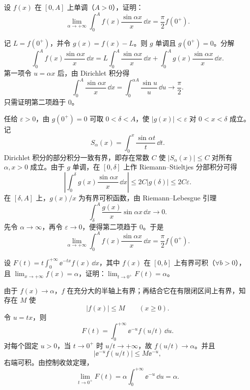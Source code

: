 \begin{xreferenceproblem}[4]
设 $f(x)$ 在 $[0,A]$ 上单调（$A>0$），证明：
  \[
    \lim_{\alpha\to+\infty}\int_0^A f(x)\frac{\sin\alpha x}{x}\,\dd x=\frac\pi2f(0^+).
  \]
\end{xreferenceproblem}
\begin{xsolution}
记 $L=f(0^+)$，并令 $g(x)=f(x)-L$。则 $g$ 单调且 $g(0^+)=0$。分解
\[
\int_0^A f(x)\frac{\sin\alpha x}{x}\,\dd x
=L\int_0^A\frac{\sin\alpha x}{x}\,\dd x
+\int_0^A g(x)\frac{\sin\alpha x}{x}\,\dd x.
\]
第一项令 $u=\alpha x$ 后，由 Dirichlet 积分得
\[
\int_0^A\frac{\sin\alpha x}{x}\,\dd x
=\int_0^{\alpha A}\frac{\sin u}{u}\,\dd u\to\frac\pi2.
\]
只需证明第二项趋于 $0$。

任给 $\varepsilon>0$，由 $g(0^+)=0$ 可取 $0<\delta<A$，使
$|g(x)|<\varepsilon$ 对 $0<x<\delta$ 成立。记
\[
S_\alpha(x)=\int_0^x\frac{\sin\alpha t}{t}\,\dd t.
\]
Dirichlet 积分的部分积分一致有界，即存在常数 $C$ 使
$|S_\alpha(x)|\leqslant C$ 对所有 $\alpha,x>0$ 成立。由于 $g$ 单调，在 $[0,\delta]$ 上作 Riemann--Stieltjes 分部积分可得
\[
\left|\int_0^\delta g(x)\frac{\sin\alpha x}{x}\,\dd x\right|
\leqslant2C|g(\delta)|\leqslant2C\varepsilon.
\]
在 $[\delta,A]$ 上，$g(x)/x$ 为有界可积函数，由 Riemann--Lebesgue 引理
\[
\int_\delta^A\frac{g(x)}x\sin\alpha x\,\dd x\to0.
\]
先令 $\alpha\to\infty$，再令 $\varepsilon\to0$，便得第二项趋于 $0$。于是
\[
\boxed{
\lim_{\alpha\to+\infty}
\int_0^A f(x)\frac{\sin\alpha x}{x}\,\dd x
=\frac\pi2f(0^+).}
\]
\end{xsolution}


\begin{xreferenceproblem}[5]
设 $F(t)=t\displaystyle\int_0^{+\infty}\ee^{-tx}f(x)\,\dd x$，其中 $f(x)$ 在 $[0,b]$ 上有界可积（$\forall b>0$），且 $\displaystyle\lim_{x\to+\infty}f(x)=\alpha$，证明：$\displaystyle\lim_{t\to0^+}F(t)=\alpha$。
\end{xreferenceproblem}
\begin{xsolution}
由于 $f(x)\to\alpha$，$f$ 在充分大的半轴上有界；再结合它在有限闭区间上有界，知存在 $M$ 使
\[
|f(x)|\leqslant M\qquad(x\geqslant0).
\]
令 $u=tx$，则
\[
F(t)=\int_0^{+\infty}\ee^{-u}f(u/t)\,\dd u.
\]
对每个固定 $u>0$，当 $t\to0^+$ 时 $u/t\to+\infty$，故
$f(u/t)\to\alpha$。并且
\[
|\ee^{-u}f(u/t)|\leqslant M\ee^{-u},
\]
右端可积。由控制收敛定理，
\[
\boxed{
\lim_{t\to0^+}F(t)
=\alpha\int_0^{+\infty}\ee^{-u}\,\dd u=\alpha.}
\]
\end{xsolution}


